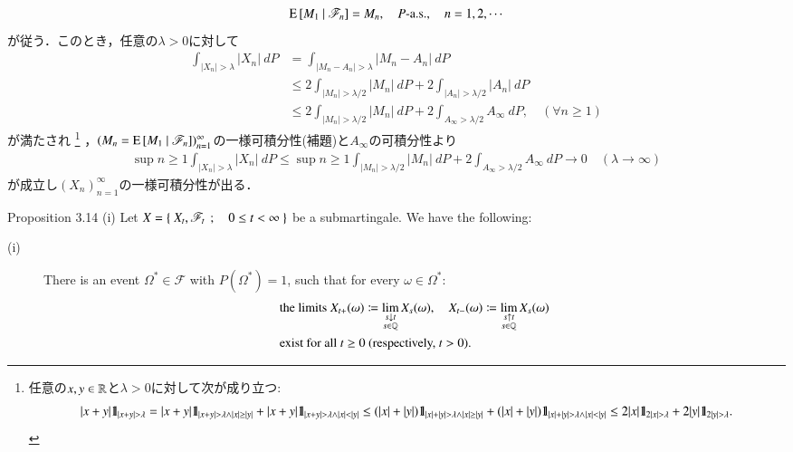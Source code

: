 \begin{prf}
\begin{align}
			\operatorname{E} \left[ M_1 \ \middle|\ \mathscr{F}_n \right] = M_n,
			\quad \mbox{$P$-a.s.},
			\quad n=1,2,\cdots
		\end{align}
		が従う．このとき，任意の$\lambda > 0$に対して
		\begin{align}
			\int_{|X_n| > \lambda} |X_n|\ dP
			&= \int_{|M_n - A_n| > \lambda} |M_n - A_n|\ dP \\
			&\leq 2 \int_{|M_n| > \lambda/2} |M_n|\ dP + 2 \int_{|A_n| > \lambda/2} |A_n|\ dP \\
			&\leq 2 \int_{|M_n| > \lambda/2} |M_n|\ dP + 2 \int_{A_\infty > \lambda/2} A_\infty\ dP,
			\quad (\forall n \geq 1)
		\end{align}
		が満たされ
		\footnote{
			任意の$x,y \in \mathbb{R}$と$\lambda > 0$に対して次が成り立つ:
			\begin{align}
				|x+y| \mbox{1}\hspace{-0.25em}\mbox{l}_{|x+y| > \lambda}
				= |x+y| \mbox{1}\hspace{-0.25em}\mbox{l}_{|x+y| > \lambda \wedge |x| \geq |y|}
				+ |x+y| \mbox{1}\hspace{-0.25em}\mbox{l}_{|x+y| > \lambda \wedge |x| < |y|}
				\leq (|x|+|y|) \mbox{1}\hspace{-0.25em}\mbox{l}_{|x|+|y| > \lambda \wedge |x| \geq |y|}
				+ (|x|+|y|) \mbox{1}\hspace{-0.25em}\mbox{l}_{|x|+|y| > \lambda \wedge |x| < |y|}
				\leq 2|x| \mbox{1}\hspace{-0.25em}\mbox{l}_{2|x| > \lambda} + 2|y| \mbox{1}\hspace{-0.25em}\mbox{l}_{2|y| > \lambda}.
			\end{align}
		}
		，$(M_n = \operatorname{E} \left[ M_1 \ \middle|\ \mathscr{F}_n \right])_{n=1}^\infty$の一様可積分性(補題)と$A_\infty$の可積分性より
		\begin{align}
			\sup{n \geq 1}{\int_{|X_n| > \lambda} |X_n|\ dP}
			\leq \sup{n \geq 1}{\int_{|M_n| > \lambda/2} |M_n|\ dP} + 2 \int_{A_\infty > \lambda/2} A_\infty\ dP
			\longrightarrow 0
			\quad (\lambda \longrightarrow \infty)
		\end{align}
		が成立し$(X_n)_{n=1}^\infty$の一様可積分性が出る．
		\QED
	\end{prf}
	
	\begin{itembox}[l]{Proposition 3.14 (i)}
		Let $X = \left\{\ X_t,\mathscr{F}_t\ \, ; \quad 0 \leq t < \infty\ \right\}$ be a submartingale. We have the following:
		\begin{description}
			\item[(i)] There is an event $\Omega^* \in \mathscr{F}$ with $P(\Omega^*) = 1$, such that for every $\omega \in \Omega^*$:
			\begin{align}
				&\mbox{the limits } X_{t+}(\omega) \coloneqq \lim_{\substack{s \downarrow t \\ s \in \mathbb{Q}}} X_s(\omega),
				\quad X_{t-}(\omega) \coloneqq \lim_{\substack{s \uparrow t \\ s \in \mathbb{Q}}} X_s(\omega) \\
				&\mbox{exist for all $t \geq 0$ (respectively, $t > 0$).}
			\end{align}
		\end{description}
	\end{itembox}
	
